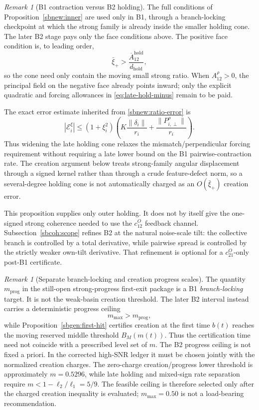 \documentclass{article} %
\theoremstyle{plain}
\theoremstyle{definition}
\theoremstyle{remark}
\newtheorem{remark}[theorem]{Remark}
\begin{document}
\begin{remark}[B1 contraction versus B2 holding]
\label{rem:B1-B2-split}
The full conditions of Proposition~\ref{sbnew:inner} are used only in B1,
through a branch-locking checkpoint at which the strong family is already
inside the smaller holding cone.  The later B2 stage pays only the face
conditions above.  The positive face condition is, to leading order,
\[
\bar\xi_+>\frac{\overline A_{12}^{\mathrm{hold}}}{d_{\mathrm{hold}}},
\]
so the cone need only contain the moving small strong ratio.  When
$A_{12}^\rho>0$, the principal field on the negative face already points
inward; only the explicit quadratic and forcing allowances in
\eqref{eq:late-hold-minus} remain to be paid.

The exact error estimate inherited from \eqref{sbnew:ratio-error} is
\[
\boxed{
|\mathcal E_i^\xi|
\le
(1+\xi_i^2)
\left(
K\frac{\|\delta_i\|}{r_i}
+\frac{\|P_{i,\perp}^\rho\|}{r_i}
\right).
}
\tag{late-hold-error}\label{eq:late-hold-error}
\]
Thus widening the late holding cone relaxes the mismatch/perpendicular
forcing requirement without requiring a late lower bound on the B1
pairwise-contraction rate.  The creation argument below treats strong-family
angular displacement through a signed kernel rather than through a crude
feature-defect norm, so a several-degree holding cone is not automatically
charged as an $O(\bar\xi_+)$ creation error.

This proposition supplies only outer holding.  It does not by itself give the
one-signed strong coherence needed to use the $c_{12}^O$ feedback channel.
Subsection~\ref{sbcoh:scope} refines B2 at the natural noise-scale tilt: the
collective branch is controlled by a total derivative, while pairwise spread
is controlled by the strictly weaker own-tilt derivative.  That refinement is
optional for a $c_{21}^O$-only post-B1 certificate.
\end{remark}

\begin{remark}[Separate branch-locking and creation progress scales]
\label{rem:separate-progress-levels}
The quantity $m_{\mathrm{prog}}$ in the still-open strong-progress first-exit
package is a B1 \emph{branch-locking} target.  It is not the weak-basin
creation threshold.  The later B2 interval instead carries a deterministic
progress ceiling
\[
\boxed{m_{\max}>m_{\mathrm{prog}},}
\]
while Proposition~\ref{sbgen:first-hit} certifies creation at the first time
$b(t)$ reaches the moving reserved middle threshold $B_M(m(t))$.  Thus the
certification time need not coincide with a prescribed level set of $m$.
The B2 progress ceiling is not fixed a priori.  In the corrected high-SNR
ledger it must be chosen jointly with the normalized creation charges.  The
zero-charge creation/progress lower threshold is approximately $m=0.5296$,
while late holding and mixed-sign rate separation require
$m<1-\ell_2/\ell_1=5/9$.  The feasible ceiling is therefore selected only
after the charged creation inequality is evaluated; $m_{\max}=0.50$ is not a
load-bearing recommendation.
\end{remark}
\end{document}
